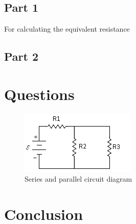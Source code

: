 \documentclass[titlepage]{article}
\begin{document}
        \subsection{Part 1} 
    For calculating the equivalent resistance

        \subsection{Part 2} 


	\section{Questions}



    \begin{figure} 
        \centering
        \caption{Series and parallel circuit diagram}
        \includegraphics[scale = 1.2]{images/questions/circuit.png}


    \end{figure}

	\section{Conclusion}
\end{document}
